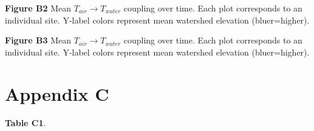 \documentclass[notitlepage]{article}
\begin{document}
\begin{center}
\textbf{Figure B2} Mean $T_{air}\rightarrow T_{water}$ coupling over time. Each plot corresponds to an individual site. Y-label colors represent mean watershed elevation (bluer=higher).
\end{center}

\begin{center}
\textbf{Figure B3} Mean $T_{air}\rightarrow T_{water}$ coupling over time. Each plot corresponds to an individual site. Y-label colors represent mean watershed elevation (bluer=higher).
\end{center}

\section*{Appendix C}

\textbf{Table C1}.
\begin{landscape}
\clearpage
{}
\end{landscape}
\end{document}
